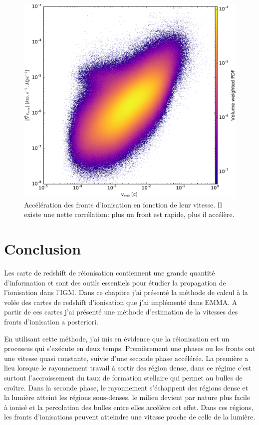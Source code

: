 \begin{figure}
        \includegraphics[width=.95\linewidth]{img/04_mapreio/v_gradv_c1.pdf} 
        \caption[Évolution de l'accélération des fronts]{Accélération des fronts d'ionisation en fonction de leur vitesse.
        Il existe une nette corrélation: plus un front est rapide, plus il accélère.
 		\label{fig:accspeed}}
\end{figure}

\clearpage
\section{Conclusion}

Les carte de redshift de réionisation contiennent une grande quantité d'information et sont des outils essentiels pour étudier la propagation de l'ionisation dans l'\ac{IGM}.
Dans ce chapitre j'ai présenté la méthode de calcul à la volée des cartes de redshift d'ionisation que j'ai implémenté dans EMMA.
A partir de ces cartes j'ai présenté une méthode d’estimation de la vitesses des fronts d'ionisation a posteriori.

En utilisant cette méthode, j'ai mis en évidence que la réionisation est un processus qui s’exécute en deux temps.
Premièrement une phases ou les fronts ont une vitesse quasi constante, suivie d'une seconde phase accélérée.
La première a lieu lorsque le rayonnement travail à sortir des région dense, dans ce régime c'est surtout l'accroissement du taux de formation stellaire qui permet au bulles de croître.
Dans la seconde phase, le rayonnement s'échappent des régions dense et la lumière atteint les régions sous-denses, le milieu devient par nature plus facile à ionisé et la percolation des bulles entre elles accélère cet effet.
Dans ces régions, les fronts d'ionisations peuvent atteindre une vitesse proche de celle de la lumière.

